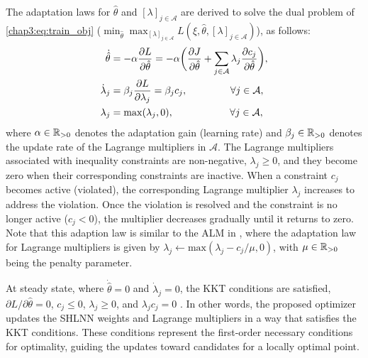 The adaptation laws for $\hat\theta$ and $[\lambda]_{j\in\mathcal A}$ are derived to solve the dual problem of \eqref{chap3:eq:train_obj} (\ie  $\min_{\hat\theta} \max_{[\lambda]_{j\in\mathcal A}}L(\xi,\hat\theta,[\lambda]_{j\in\mathcal A})$), as follows:
    \begin{align}
            \dot {\hat\theta}&=-\alpha {\partial L\over\partial \hat\theta}
            =-\alpha 
            \bigg(
            {\partial J\over \partial \hat\theta}+\sum_{j\in\mathcal{A}}
            \lambda_j {\partial c_j\over\partial \hat\theta}
            \bigg),
        \label{chap3:eq:adap_th}
            \\
            \dot\lambda_j& = \beta_j{\partial L\over\partial \lambda_j} = \beta_j c_j ,
            \quad\quad\quad\quad      \      
            \forall j\in\mathcal A,
        \label{chap3:eq:adap_L}
            \\
            \lambda_j & = \max(\lambda_j,0) ,
            \quad\quad\quad\quad\ \ \ \ \ 
            \forall j\in\mathcal A,
        \label{chap3:eq:adap_L_max}
    \end{align}
where $\alpha\in\mathbb{R}_{>0}$ denotes the adaptation gain (learning rate) and $\beta_j\in\mathbb{R}_{>0}$ denotes the update rate of the Lagrange multipliers in $\mathcal A$. 
The Lagrange multipliers associated with inequality constraints are non-negative, \ie $\lambda_j\ge 0$, and they become zero when their corresponding constraints are inactive.
When a constraint $c_j$ becomes active (\ie violated), the corresponding Lagrange multiplier $\lambda_j$ increases to address the violation. 
Once the violation is resolved and the constraint is no longer active (\ie $c_j < 0$), the multiplier decreases gradually until it returns to zero. 
Note that this adaption law is similar to the ALM in \cite{RN22}, where the adaptation law for Lagrange multipliers is given by $\lambda_j\leftarrow \text{max}(\lambda_j-c_j/\mu,0)$, with $\mu\in\mathbb{R}_{>0}$ being the penalty parameter. 
    
At steady state, where $\dot{\hat\theta}=0$ and $\dot\lambda_j=0$, the KKT conditions are satisfied, \ie $\partial L/\partial \hat\theta=0$, $c_j \le 0$, $\lambda_j \ge 0$, and $\lambda_j c_j=0$ \cite[Chap.~12 T.~12.1]{RN9}.
In other words, the proposed optimizer updates the SHLNN weights and Lagrange multipliers in a way that satisfies the KKT conditions. These conditions represent the first-order necessary conditions for optimality, guiding the updates toward candidates for a locally optimal point.

